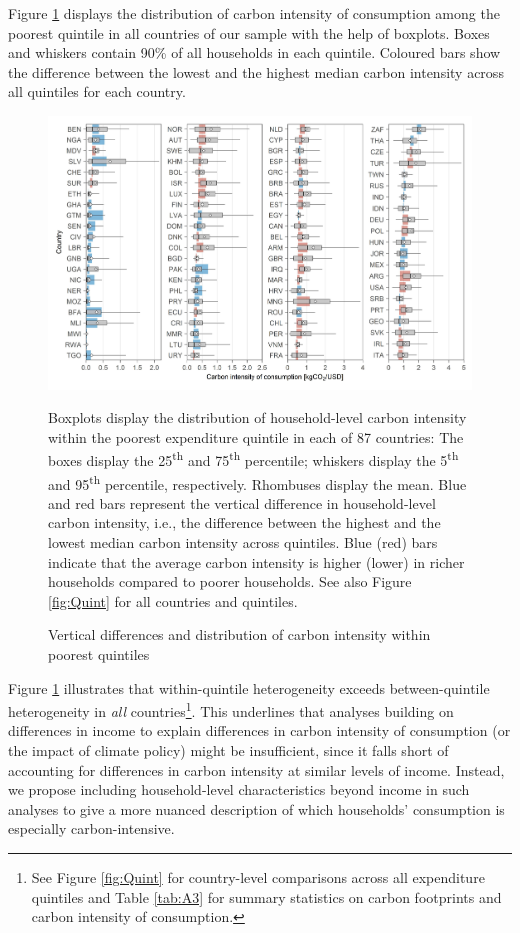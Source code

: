 \documentclass[12pt, a4paper]{article}
\newenvironment{subcaption2}
{\strut
\vspace{-5pt}
\begin{minipage}[b]{0.9\textwidth}
  \hspace*{-\parindent}
  \footnotesize}
 {\end{minipage}}
\begin{document}
Figure \ref{fig:fig_1} displays the distribution of carbon intensity of consumption among the poorest quintile in all countries of our sample with the help of boxplots. Boxes and whiskers contain 90\% of all households in each quintile. Coloured bars show the difference between the lowest and the highest median carbon intensity across all quintiles for each country.

\begin{figure}[ht!]
    \centering
    \includegraphics{Figure 1/Figure_1_2017}
    \caption{Vertical differences and distribution of carbon intensity within poorest quintiles}
    \label{fig:fig_1}
    \begin{subcaption2}
    Boxplots display the distribution of household-level carbon intensity within the poorest expenditure quintile in each of 87 countries: The boxes display the 25\textsuperscript{th} and 75\textsuperscript{th} percentile; whiskers display the 5\textsuperscript{th} and 95\textsuperscript{th} percentile, respectively. Rhombuses display the mean. Blue and red bars represent the vertical difference in household-level carbon intensity, i.e., the difference between the highest and the lowest median carbon intensity across quintiles. Blue (red) bars indicate that the average carbon intensity is higher (lower) in richer households compared to poorer households. See also Figure \ref{fig:Quint} for all countries and quintiles.
    \end{subcaption2}
\end{figure}

Figure \ref{fig:fig_1} illustrates that within-quintile heterogeneity exceeds between-quintile heterogeneity in \textit{all} countries\footnote{See Figure \ref{fig:Quint} for country-level comparisons across all expenditure quintiles and Table \ref{tab:A3} for summary statistics on carbon footprints and carbon intensity of consumption.}. This underlines that analyses building on differences in income to explain differences in carbon intensity of consumption (or the impact of climate policy) might be insufficient, since it falls short of accounting for differences in carbon intensity at similar levels of income. Instead, we propose including household-level characteristics beyond income in such analyses to give a more nuanced description of which households' consumption is especially carbon-intensive.
\end{document}
